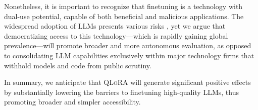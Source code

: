 Nonetheless, it is important to recognize that finetuning is a technology with dual-use potential, capable of both beneficial and malicious applications. The widespread adoption of LLMs presents various risks \citep{bommasani2021opportunities,bender2021dangers}, yet we argue that democratizing access to this technology—which is rapidly gaining global prevalence—will promote broader and more autonomous evaluation, as opposed to consolidating LLM capabilities exclusively within major technology firms that withhold models and code from public scrutiny.

In summary, we anticipate that \textsc{QLoRA} will generate significant positive effects by substantially lowering the barriers to finetuning high-quality LLMs, thus promoting broader and simpler accessibility.